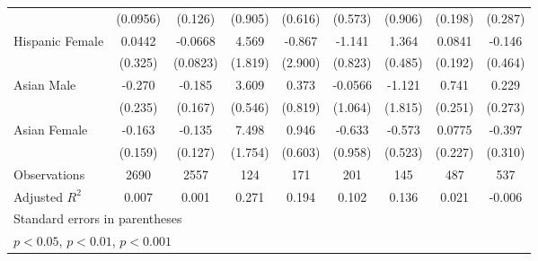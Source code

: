\begin{sidewaystable}
{\begin{longtable}{l*{8}{c}}
                    &    (0.0956)         &     (0.126)         &     (0.905)         &     (0.616)         &     (0.573)         &     (0.906)         &     (0.198)         &     (0.287)         \\
[1em]
Hispanic Female     &      0.0442         &     -0.0668         &       4.569\sym{*}  &      -0.867         &      -1.141         &       1.364\sym{**} &      0.0841         &      -0.146         \\
                    &     (0.325)         &    (0.0823)         &     (1.819)         &     (2.900)         &     (0.823)         &     (0.485)         &     (0.192)         &     (0.464)         \\
[1em]
Asian Male          &      -0.270         &      -0.185         &       3.609\sym{***}&       0.373         &     -0.0566         &      -1.121         &       0.741\sym{**} &       0.229         \\
                    &     (0.235)         &     (0.167)         &     (0.546)         &     (0.819)         &     (1.064)         &     (1.815)         &     (0.251)         &     (0.273)         \\
[1em]
Asian Female        &      -0.163         &      -0.135         &       7.498\sym{***}&       0.946         &      -0.633         &      -0.573         &      0.0775         &      -0.397         \\
                    &     (0.159)         &     (0.127)         &     (1.754)         &     (0.603)         &     (0.958)         &     (0.523)         &     (0.227)         &     (0.310)         \\
\hline
Observations        &        2690         &        2557         &         124         &         171         &         201         &         145         &         487         &         537         \\
Adjusted \(R^{2}\)  &       0.007         &       0.001         &       0.271         &       0.194         &       0.102         &       0.136         &       0.021         &      -0.006         \\
\hline\hline
\multicolumn{9}{l}{\footnotesize Standard errors in parentheses}\\
\multicolumn{9}{l}{\footnotesize \sym{*} \(p<0.05\), \sym{**} \(p<0.01\), \sym{***} \(p<0.001\)}\\

\end{longtable}}
\end{sidewaystable}
